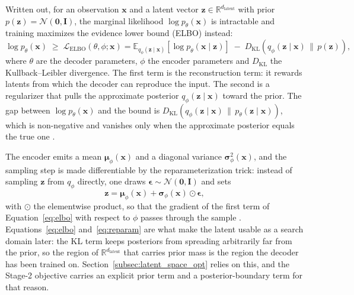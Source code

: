 Written out, for an observation $\mathbf{x}$ and a latent vector
$\mathbf{z} \in \mathbb{R}^{d_{\mathrm{latent}}}$ with prior
$p(\mathbf{z}) = \mathcal{N}(\mathbf{0}, \mathbf{I})$, the marginal likelihood
$\log p_\theta(\mathbf{x})$ is intractable and training maximizes the evidence
lower bound (ELBO) instead:
\begin{equation}
\log p_\theta(\mathbf{x}) \;\ge\;
\mathcal{L}_{\mathrm{ELBO}}(\theta, \phi; \mathbf{x}) =
\mathbb{E}_{q_\phi(\mathbf{z}\mid\mathbf{x})}\!\left[\log p_\theta(\mathbf{x}\mid\mathbf{z})\right]
\;-\; D_{\mathrm{KL}}\!\left(q_\phi(\mathbf{z}\mid\mathbf{x}) \,\big\|\, p(\mathbf{z})\right),
\label{eq:elbo}
\end{equation}
where $\theta$ are the decoder parameters, $\phi$ the encoder parameters and
$D_{\mathrm{KL}}$ the Kullback--Leibler divergence. The first term is the
reconstruction term: it rewards latents from which the decoder can reproduce the
input. The second is a regularizer that pulls the approximate posterior
$q_\phi(\mathbf{z}\mid\mathbf{x})$ toward the prior. The gap between
$\log p_\theta(\mathbf{x})$ and the bound is
$D_{\mathrm{KL}}(q_\phi(\mathbf{z}\mid\mathbf{x}) \,\|\, p_\theta(\mathbf{z}\mid\mathbf{x}))$,
which is non-negative and vanishes only when the approximate posterior equals the
true one \cite{kingma2013auto}.

The encoder emits a mean $\boldsymbol{\mu}_\phi(\mathbf{x})$ and a diagonal
variance $\boldsymbol{\sigma}^2_\phi(\mathbf{x})$, and the sampling step is made
differentiable by the reparameterization trick: instead of sampling
$\mathbf{z}$ from $q_\phi$ directly, one draws
$\boldsymbol{\epsilon} \sim \mathcal{N}(\mathbf{0}, \mathbf{I})$ and sets
\begin{equation}
\mathbf{z} = \boldsymbol{\mu}_\phi(\mathbf{x})
+ \boldsymbol{\sigma}_\phi(\mathbf{x}) \odot \boldsymbol{\epsilon},
\label{eq:reparam}
\end{equation}
with $\odot$ the elementwise product, so that the gradient of the first term of
Equation~\ref{eq:elbo} with respect to $\phi$ passes through the sample
\cite{kingma2013auto}. Equations~\ref{eq:elbo} and~\ref{eq:reparam} are what
make the latent usable as a search domain later: the KL term keeps posteriors
from spreading arbitrarily far from the prior, so the region of
$\mathbb{R}^{d_{\mathrm{latent}}}$ that carries prior mass is the region the
decoder has been trained on. Section~\ref{subsec:latent_space_opt} relies on
this, and the Stage-2 objective carries an explicit prior term and a
posterior-boundary term for that reason.

